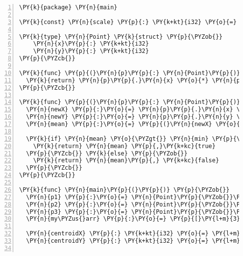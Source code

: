 \begin{Verbatim}[commandchars=\\\{\},numbers=left,firstnumber=1,stepnumber=1]
\PY{k}{package} \PY{n}{main}

\PY{k}{const} \PY{n}{scale} \PY{p}{:} \PY{k+kt}{i32} \PY{o}{=} \PY{l+m}{2}

\PY{k}{type} \PY{n}{Point} \PY{k}{struct} \PY{p}{\PYZob{}}
    \PY{n}{x}\PY{p}{:} \PY{k+kt}{i32}
    \PY{n}{y}\PY{p}{:} \PY{k+kt}{i32}
\PY{p}{\PYZcb{}}

\PY{k}{func} \PY{p}{(}\PY{n}{p}\PY{p}{:} \PY{n}{Point}\PY{p}{)} \PY{n}{calcDist}\PY{p}{(}\PY{p}{)} \PY{k+kt}{i32}\PY{p}{\PYZob{}}
  \PY{k}{return} \PY{n}{p}\PY{p}{.}\PY{n}{x} \PY{o}{*} \PY{n}{p}\PY{p}{.}\PY{n}{x} \PY{o}{+} \PY{n}{p}\PY{p}{.}\PY{n}{y} \PY{o}{*} \PY{n}{p}\PY{p}{.}\PY{n}{y}
\PY{p}{\PYZcb{}}

\PY{k}{func} \PY{p}{(}\PY{n}{p}\PY{p}{:} \PY{n}{Point}\PY{p}{)} \PY{n}{withScaleEnough} \PY{p}{(}\PY{n}{min}\PY{p}{:}\PY{k+kt}{i32}\PY{p}{)} \PY{p}{(}\PY{k+kt}{i32}\PY{p}{,} \PY{k+kt}{bool}\PY{p}{)} \PY{p}{\PYZob{}}
  \PY{n}{newX} \PY{p}{:}\PY{o}{=} \PY{n}{p}\PY{p}{.}\PY{n}{x} \PY{o}{*} \PY{n}{scale} 
  \PY{n}{newY} \PY{p}{:}\PY{o}{=} \PY{n}{p}\PY{p}{.}\PY{n}{y} \PY{o}{*} \PY{n}{scale} 
  \PY{n}{mean} \PY{p}{:}\PY{o}{=} \PY{p}{(}\PY{n}{newX} \PY{o}{+} \PY{n}{newY}\PY{p}{)} \PY{o}{/} \PY{l+m}{2}

  \PY{k}{if} \PY{n}{mean} \PY{o}{\PYZgt{}} \PY{n}{min} \PY{p}{\PYZob{}}
    \PY{k}{return} \PY{n}{mean} \PY{p}{,}\PY{k+kc}{true}
  \PY{p}{\PYZcb{}} \PY{k}{else} \PY{p}{\PYZob{}}
    \PY{k}{return} \PY{n}{mean}\PY{p}{,} \PY{k+kc}{false}
  \PY{p}{\PYZcb{}}
\PY{p}{\PYZcb{}}

\PY{k}{func} \PY{n}{main}\PY{p}{(}\PY{p}{)} \PY{p}{\PYZob{}}
  \PY{n}{p1} \PY{p}{:}\PY{o}{=} \PY{n}{Point}\PY{p}{\PYZob{}}\PY{n}{x}\PY{p}{:}\PY{l+m}{10}\PY{p}{,}\PY{n}{y}\PY{p}{:}\PY{l+m}{10}\PY{p}{\PYZcb{}}
  \PY{n}{p2} \PY{p}{:}\PY{o}{=} \PY{n}{Point}\PY{p}{\PYZob{}}\PY{n}{x}\PY{p}{:}\PY{l+m}{20}\PY{p}{,}\PY{n}{y}\PY{p}{:}\PY{l+m}{20}\PY{p}{\PYZcb{}}
  \PY{n}{p3} \PY{p}{:}\PY{o}{=} \PY{n}{Point}\PY{p}{\PYZob{}}\PY{n}{x}\PY{p}{:}\PY{l+m}{27}\PY{p}{,}\PY{n}{y}\PY{p}{:}\PY{l+m}{15}\PY{p}{\PYZcb{}}
  \PY{n}{my\PYZus{}arr} \PY{p}{:}\PY{o}{=} \PY{p}{[}\PY{l+m}{3}\PY{p}{]}\PY{n}{Point}\PY{p}{\PYZob{}}\PY{n}{p1}\PY{p}{,}\PY{n}{p2}\PY{p}{,}\PY{n}{p3}\PY{p}{\PYZcb{}}

  \PY{n}{centroidX} \PY{p}{:} \PY{k+kt}{i32} \PY{o}{=} \PY{l+m}{0}
  \PY{n}{centroidY} \PY{p}{:} \PY{k+kt}{i32} \PY{o}{=} \PY{l+m}{0}


\end{Verbatim}
